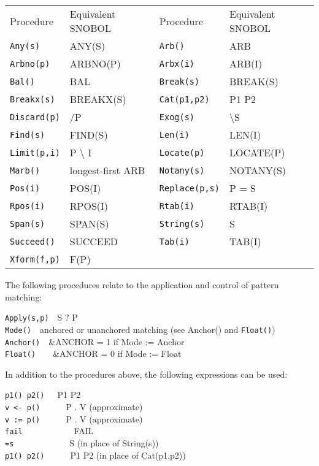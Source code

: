 \begin{supertabular}{m{1.2in} m{1.7in} m{1.2in} m{1.7in}}

Procedure & Equivalent SNOBOL & Procedure & Equivalent SNOBOL \\

\texttt{Any(s)} & ANY(S) & \texttt{Arb()} & ARB\\
\texttt{Arbno(p)} & ARBNO(P) & \texttt{Arbx(i)} & ARB(I)\\
\texttt{Bal()} & BAL & \texttt{Break(s)} & BREAK(S)\\
\texttt{Breakx(s)} & BREAKX(S) & \texttt{Cat(p1,p2)} & P1 P2\\
\texttt{Discard(p)} & /P & \texttt{Exog(s)} & {\textbackslash}S\\
\texttt{Find(s)} & FIND(S) & \texttt{Len(i)} & LEN(I)\\
\texttt{Limit(p,i)} & P {\textbackslash} I & \texttt{Locate(p)} & LOCATE(P)\\
\texttt{Marb()} & longest-first ARB & \texttt{Notany(s)} & NOTANY(S)\\
\texttt{Pos(i)} & POS(I) & \texttt{Replace(p,s)} & P = S\\
\texttt{Rpos(i)} & RPOS(I) & \texttt{Rtab(i)} & RTAB(I)\\
\texttt{Span(s)} & SPAN(S) & \texttt{String(s)} & S\\
\texttt{Succeed()} & SUCCEED & \texttt{Tab(i)} & TAB(I)\\
\texttt{Xform(f,p)} & F(P) \\
\end{supertabular}

The following procedures relate to the application and control of
pattern matching:

\texttt{Apply(s,p)}\ \ S ? P\\
\texttt{Mode()}\ \ anchored or unanchored matching (see Anchor() and
\texttt{Float()})\\
\texttt{Anchor()}\ \ \&ANCHOR = 1 if Mode := Anchor\\
\texttt{Float()}\ \ \ \ \&ANCHOR = 0 if Mode := Float

In addition to the procedures above, the following expressions can be
used:

\texttt{p1() {\textbar} p2()}\ \ \ P1 {\textbar} P2\\
\texttt{v {\textless}- p()}\ \ \ \ \ \ P . V (approximate)\\
\texttt{v := p()}\ \ \ \ \ \ P . V (approximate)\\
\texttt{fail}\ \ \ \ \ \ \ \ \ \ \ \ FAIL\\
\texttt{=s}\ \ \ \ \ \ \ \ \ \ \ \ \ S (in place of String(s))\\
\texttt{p1() {\textbar}{\textbar} p2()}\ \ \ \ \ \ P1 P2 (in place of Cat(p1,p2))

